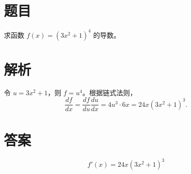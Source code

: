
\section*{题目}

求函数 $f(x)=(3x^2+1)^4$ 的导数。

\section*{解析}

令 $u=3x^2+1$，则 $f=u^4$。根据链式法则，
\[
\frac{df}{dx}=\frac{df}{du}\frac{du}{dx}
=4u^3\cdot6x=24x(3x^2+1)^3.
\]

\section*{答案}

\[\boxed{f'(x)=24x(3x^2+1)^3}\]
